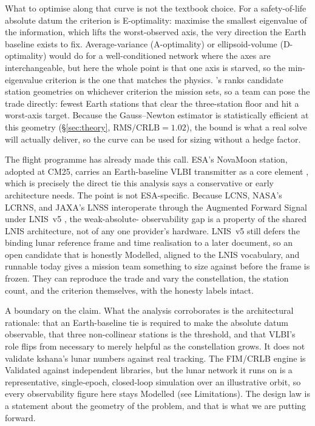 What to optimise along that curve is not the textbook choice. For a
safety-of-life absolute datum the criterion is E-optimality: maximise the
smallest eigenvalue of the information, which lifts the worst-observed axis, the
very direction the Earth baseline exists to fix. Average-variance (A-optimality)
or ellipsoid-volume (D-optimality) would do for a well-conditioned network where
the axes are interchangeable, but here the whole point is that one axis is starved,
so the min-eigenvalue criterion is the one that matches the physics.
's  ranks candidate station geometries on whichever
criterion the mission sets, so a team can pose the trade directly: fewest Earth
stations that clear the three-station floor and hit a worst-axis target. Because
the Gauss--Newton estimator is statistically efficient at this geometry
(\S\ref{sec:theory}, $\text{RMS}/\text{CRLB} = 1.02$), the bound is what a
real solve will actually deliver, so the curve can be used for sizing without a
hedge factor.

The flight programme has already made this call. ESA's NovaMoon station, adopted
at CM25, carries an Earth-baseline VLBI transmitter as a core element
\citep{molli2026novamoon}, which is precisely the direct tie this analysis says a
conservative or early architecture needs. The point is not ESA-specific. Because
LCNS, NASA's LCRNS, and JAXA's LNSS interoperate through the Augmented Forward
Signal under LNIS~v5 \citep{nasa2025lnis,nasa2025afs}, the weak-absolute-%
observability gap is a property of the shared LNIS architecture, not of any one
provider's hardware. LNIS~v5 still defers the binding lunar reference frame and
time realisation to a later document, so an open candidate that is honestly
Modelled, aligned to the LNIS vocabulary, and runnable today gives a mission team
something to size against before the frame is frozen. They can reproduce the
trade and vary the constellation, the station count, and the criterion themselves,
with the honesty labels intact.

A boundary on the claim. What the analysis corroborates is the architectural
rationale: that an Earth-baseline tie is required to make the absolute datum
observable, that three non-collinear stations is the threshold, and that VLBI's
role flips from necessary to merely helpful as the constellation grows. It does
not validate kshana's lunar numbers against real tracking. The FIM/CRLB engine is
Validated against independent libraries, but the lunar network it runs on is a
representative, single-epoch, closed-loop simulation over an illustrative orbit,
so every observability figure here stays Modelled (see Limitations). The design
law is a statement about the geometry of the problem, and that is what we are
putting forward.
